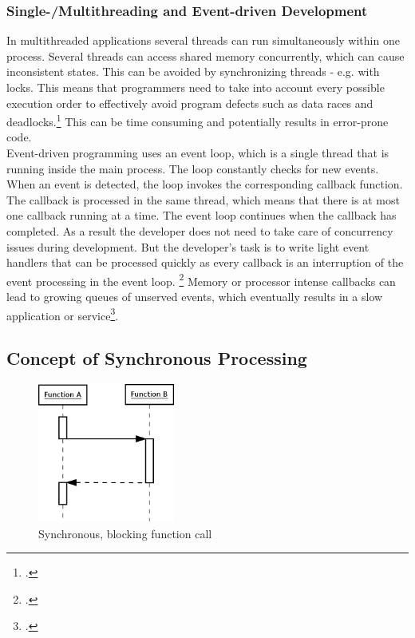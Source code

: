 \subsubsection{Single-/Multithreading and Event-driven Development}
\label{issue_threads}

In multithreaded applications several threads can run simultaneously within one 
process. Several threads can access shared memory concurrently, which can
cause inconsistent states. This can be avoided by synchronizing threads - e.g.
with locks. This means that programmers need to take into account every possible
execution order to effectively avoid program defects such as data races and 
deadlocks.\footcite[Cf.][10]{Breshears_2009}
This can be time consuming and potentially results in error-prone code.\\

Event-driven programming uses an event loop, which is a single thread that is
running inside the main process.
The loop constantly checks for new events. When an event is detected, the loop
invokes the corresponding callback function. The callback is processed in the
same thread, which means that there is at most one callback running at a time.
The event loop continues when the callback has completed. As a result the
developer does not need to take care of concurrency issues during development.
But the developer's task is to write light event handlers that can be processed
quickly as every callback is an interruption of the event processing in the
event loop. \footcite[Cf.][]{Croucher_2010} Memory or processor intense callbacks
can lead to growing queues of unserved events, which eventually results
in a slow application or service\footcite[Cf.][48]{teixeira_2012}.

\subsection{Concept of Synchronous Processing}
\label{concept_sync}
\FloatBarrier

\begin{figure}[hbtp]
\centering
\includegraphics[width=0.4\textwidth]{img/synch_call.png}
\caption{Synchronous, blocking function call}
\label{fig:synch_call}
\end{figure}

